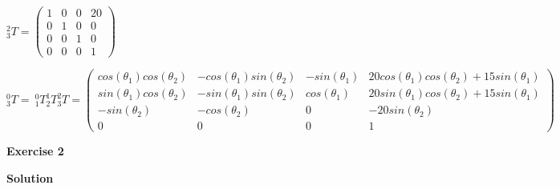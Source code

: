 \documentclass[8pt]{article}
\begin{document}
$^2_3T = \left( \begin{array}{cccc}
1 & 0 & 0 & 20 \\
0 & 1 & 0 & 0 \\
0& 0 & 1 & 0 \\
0 & 0 & 0 & 1
\end{array} \right) $

$^0_3T = \ ^0_1T ^1_2T ^2_3T = \left( \begin{array}{cccc}
cos(\theta_1) cos(\theta_2) & -cos(\theta_1) sin(\theta_2) & -sin(\theta_1) & 20cos(\theta_1) cos(\theta_2) + 15 sin(\theta_1) \\
sin(\theta_1) cos(\theta_2) & - sin(\theta_1) sin(\theta_2) & cos(\theta_1) & 20 sin(\theta_1) cos(\theta_2) + 15 sin(\theta_1) \\
-sin(\theta_2) & -cos(\theta_2) & 0 & -20 sin(\theta_2) \\
0 & 0 & 0 & 1
\end{array} \right) $

\textbf{Exercise 2}		
		
\textbf{Solution}

\medskip
\end{document}
